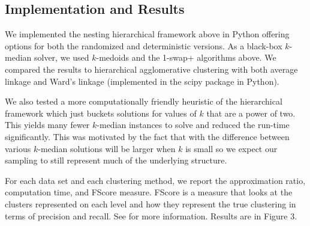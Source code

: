 \documentclass{article}
\begin{document}
\subsection{Implementation and Results}
We implemented the nesting hierarchical framework above in Python offering options for both the randomized and deterministic versions. As a black-box $k$-median solver, we used $k$-medoids and the 1-swap+ algorithms above. We compared the results to hierarchical agglomerative clustering with both average linkage and Ward's linkage (implemented in the scipy package in Python). 

We also tested a more computationally friendly heuristic of the hierarchical framework which just buckets solutions for values of $k$ that are a power of two. This yields many fewer $k$-median instances to solve and reduced the run-time significantly. This was motivated by the fact that with the difference between various $k$-median solutions will be larger when $k$ is small so we expect our sampling to still represent much of the underlying structure. 
 
For each data set and each clustering method, we report the approximation ratio, computation time, and FScore measure.  FScore is a measure that looks at the clusters represented on each level and how they represent the true clustering in terms of precision and recall. See \cite{Larsen} for more information.  Results are in Figure 3.
\end{document}
